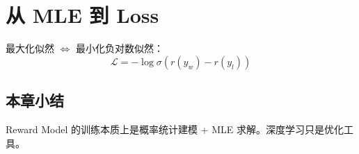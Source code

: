 \section{从 MLE 到 Loss}
最大化似然 $\Leftrightarrow$ 最小化负对数似然：
$$\mathcal{L} = -\log \sigma(r(y_w) - r(y_l))$$

\subsection{本章小结}
Reward Model 的训练本质上是概率统计建模 + MLE 求解。深度学习只是优化工具。

\newpage
